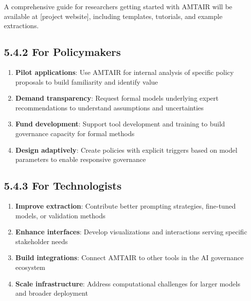 \documentclass[
  11pt,
  letterpaper,
]{book}
\begin{document}
\begin{tcolorbox}[enhanced jigsaw, opacityback=0, leftrule=.75mm, breakable, coltitle=black, colbacktitle=quarto-callout-tip-color!10!white, bottomrule=.15mm, rightrule=.15mm, toprule=.15mm, left=2mm, bottomtitle=1mm, arc=.35mm, toptitle=1mm, titlerule=0mm, title=\textcolor{quarto-callout-tip-color}{\faLightbulb}\hspace{0.5em}{Quick Start Guide}, opacitybacktitle=0.6, colframe=quarto-callout-tip-color-frame, colback=white]

A comprehensive guide for researchers getting started with AMTAIR will
be available at {[}project website{]}, including templates, tutorials,
and example extractions.

\end{tcolorbox}

\subsection*{5.4.2 For
Policymakers}\label{sec-policymaker-recommendations}

\begin{enumerate}
\def\labelenumi{\arabic{enumi}.}
\item
  \textbf{Pilot applications}: Use AMTAIR for internal analysis of
  specific policy proposals to build familiarity and identify value
\item
  \textbf{Demand transparency}: Request formal models underlying expert
  recommendations to understand assumptions and uncertainties
\item
  \textbf{Fund development}: Support tool development and training to
  build governance capacity for formal methods
\item
  \textbf{Design adaptively}: Create policies with explicit triggers
  based on model parameters to enable responsive governance
\end{enumerate}

\subsection*{5.4.3 For
Technologists}\label{sec-technologist-recommendations}

\begin{enumerate}
\def\labelenumi{\arabic{enumi}.}
\item
  \textbf{Improve extraction}: Contribute better prompting strategies,
  fine-tuned models, or validation methods
\item
  \textbf{Enhance interfaces}: Develop visualizations and interactions
  serving specific stakeholder needs
\item
  \textbf{Build integrations}: Connect AMTAIR to other tools in the AI
  governance ecosystem
\item
  \textbf{Scale infrastructure}: Address computational challenges for
  larger models and broader deployment
\end{enumerate}
\end{document}
